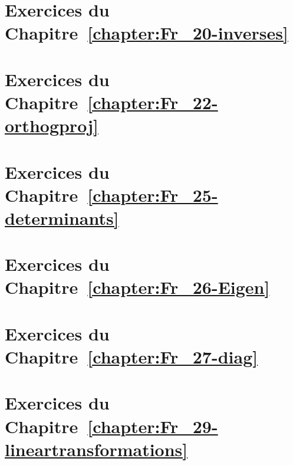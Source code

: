 \section*{Exercices du Chapitre~\ref{chapter:Fr_20-inverses}}

  
\section*{Exercices du Chapitre~\ref{chapter:Fr_22-orthogproj}}


\section*{Exercices du Chapitre~\ref{chapter:Fr_25-determinants}}



\section*{Exercices du Chapitre~\ref{chapter:Fr_26-Eigen}}


\section*{Exercices du Chapitre~\ref{chapter:Fr_27-diag}}\label{sol:23}

 

\section*{Exercices du Chapitre~\ref{chapter:Fr_29-lineartransformations}}\label{sol:24}


